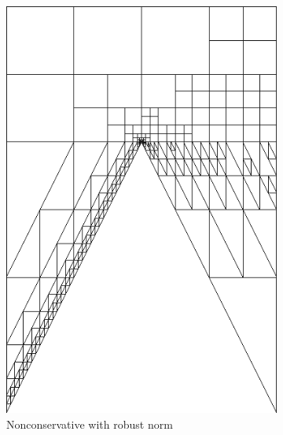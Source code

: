 \documentclass[letterpaper]{article}
\begin{document}
\begin{figure}
\begin{subfigure}[t]{0.4\textwidth}
\includegraphics[width=\textwidth]{figs/Wedge/robust16nc_mesh.png}
\caption{Nonconservative with robust norm}
\label{fig:wedgeRobust16nc_mesh}
\end{subfigure}
\begin{subfigure}[t]{0.4\textwidth}
\centering

\end{subfigure}
\end{figure}
\end{document}
